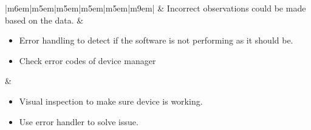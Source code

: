 \documentclass{article}
\begin{document}
\begin{table}[H]
\begin{tabular}{|m{6em}|m{5em}|m{5em}|m{5em}|m{5em}|m{9em}|}
			 & Incorrect observations could be made based on the data.
			 & \begin{minipage}[t]{\linewidth}
				   \begin{itemize}[nosep, wide=0pt, leftmargin=*, after=\strut]
					\item Error handling to detect if the software is not performing as it should be.
					\item Check error codes of device manager
				\end{itemize}
			   \end{minipage}
	
			 & \begin{minipage}[t]{\linewidth}
				   \begin{itemize}[nosep, wide=0pt, leftmargin=*, after=\strut]
					\item Visual inspection to make sure device is working.
					\item Use error handler to solve issue.
				\end{itemize}
			   \end{minipage}  \tabularnewline{}
		\end{tabular}%
	\end{table}
	
\end{document}
